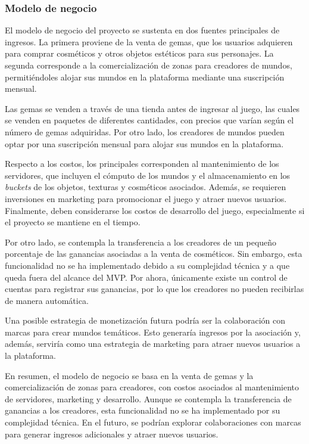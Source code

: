 \subsubsection{Modelo de negocio}
\label{sec:business-model}

El modelo de negocio del proyecto se sustenta en dos fuentes principales de ingresos. La primera proviene de la
venta de gemas, que los usuarios adquieren para comprar cosméticos y otros objetos estéticos para sus personajes.
La segunda corresponde a la comercialización de zonas para creadores de mundos, permitiéndoles alojar sus mundos en la
plataforma mediante una suscripción mensual.
\vspace{0.25cm}

Las gemas se venden a través de una tienda antes de ingresar al juego, las cuales se venden en paquetes de diferentes 
cantidades, con precios que varían según el número de gemas adquiridas. Por otro lado, los creadores de mundos pueden 
optar por una suscripción mensual para alojar sus mundos en la plataforma.
\vspace{0.25cm}

Respecto a los costos, los principales corresponden al mantenimiento de los servidores, que incluyen el cómputo de los
mundos y el almacenamiento en los \textit{buckets} de los objetos, texturas y cosméticos asociados. Además, se requieren
inversiones en marketing para promocionar el juego y atraer nuevos usuarios. Finalmente, deben considerarse los costos de
desarrollo del juego, especialmente si el proyecto se mantiene en el tiempo.
\vspace{0.25cm}

Por otro lado, se contempla la transferencia a los creadores de un pequeño porcentaje de las ganancias asociadas a la
venta de cosméticos. Sin embargo, esta funcionalidad no se ha implementado debido a su complejidad técnica y a que
queda fuera del alcance del MVP. Por ahora, únicamente existe un control de cuentas para registrar sus ganancias, por
lo que los creadores no pueden recibirlas de manera automática. 
\vspace{0.25cm}

Una posible estrategia de monetización futura podría ser la colaboración con marcas para crear mundos temáticos. Esto 
generaría ingresos por la asociación y, además, serviría como una estrategia de marketing para atraer nuevos usuarios 
a la plataforma.
\vspace{0.25cm}

En resumen, el modelo de negocio se basa en la venta de gemas y la comercialización de zonas para creadores, con costos 
asociados al mantenimiento de servidores, marketing y desarrollo. Aunque se contempla la transferencia de ganancias a 
los creadores, esta funcionalidad no se ha implementado por su complejidad técnica. En el futuro, se podrían explorar 
colaboraciones con marcas para generar ingresos adicionales y atraer nuevos usuarios.
\vspace{0.25cm}
